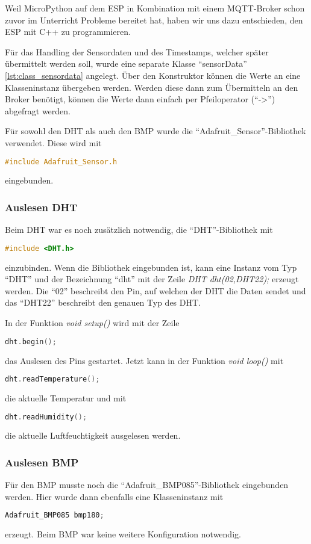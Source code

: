 Weil MicroPython auf dem ESP in Kombination mit einem MQTT-Broker schon 
zuvor im Unterricht Probleme bereitet hat, haben wir uns dazu entschieden, den ESP mit C++ zu programmieren.

Für das Handling der Sensordaten und des Timestamps, welcher später übermittelt werden soll, wurde eine separate Klasse "`sensorData"' \ref{lst:class_sensordata} angelegt.
Über den Konstruktor können die Werte an eine Klasseninstanz übergeben werden. 
Werden diese dann zum Übermitteln an den Broker benötigt, können die Werte dann einfach per Pfeiloperator ("`->"') abgefragt werden.

Für sowohl den DHT als auch den BMP wurde die "`Adafruit\_Sensor"'-Bibliothek verwendet.
Diese wird mit 
\begin{lstlisting}[language=C++]
	#include Adafruit_Sensor.h
\end{lstlisting}
eingebunden.

\subsubsection{Auslesen DHT}
	Beim DHT war es noch zusätzlich notwendig, die "`DHT"'-Bibliothek mit 
\begin{lstlisting}[language=C++]
	#include <DHT.h>
\end{lstlisting}
 	einzubinden.
	Wenn die Bibliothek eingebunden ist, kann eine Instanz vom Typ "`DHT"' und der Bezeichnung "`dht"' mit der Zeile \textit{DHT dht(02,DHT22);} erzeugt werden.
	Die "`02"' beschreibt den Pin, auf welchen der DHT die Daten sendet und das "`DHT22"' beschreibt den genauen Typ des DHT.
	
	In der Funktion \textit{void setup()} wird mit der Zeile
\begin{lstlisting}[language=C++]
	dht.begin();
\end{lstlisting}
	das Auslesen des Pins gestartet. 
	Jetzt kann in der Funktion \textit{void loop()} mit 
\begin{lstlisting}[language=C++]
	dht.readTemperature();
\end{lstlisting}
	die aktuelle Temperatur und mit
\begin{lstlisting}[language=C++]
	dht.readHumidity();
\end{lstlisting}
	die aktuelle Luftfeuchtigkeit ausgelesen werden.
	
\subsubsection{Auslesen BMP}
	Für den BMP musste noch die "`Adafruit\_BMP085"'-Bibliothek eingebunden werden.
	Hier wurde dann ebenfalls eine Klasseninstanz mit 
\begin{lstlisting}[language=C++]
	Adafruit_BMP085 bmp180;
\end{lstlisting}
	erzeugt. Beim BMP war keine weitere Konfiguration notwendig.
	
